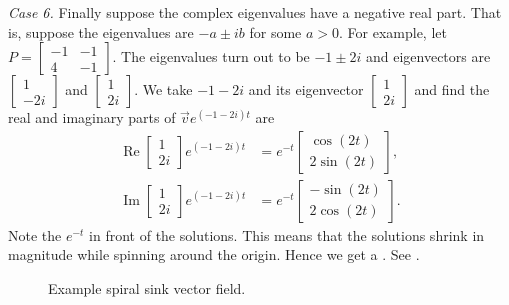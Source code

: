 \documentclass[12pt]{book}
\begin{document}
\medskip

\emph{Case 6.} Finally suppose the complex eigenvalues have a negative real
part.  That is, suppose the eigenvalues are $-a \pm ib$ for some $a > 0$.
For example, let $P = 
\left[ \begin{smallmatrix} -1 & -1 \\ 4 & -1 \end{smallmatrix} \right]$.
The eigenvalues turn out to be $-1\pm 2i$ and eigenvectors are
$\left[ \begin{smallmatrix} 1 \\ -2i \end{smallmatrix} \right]$ and
$\left[ \begin{smallmatrix} 1 \\ 2i \end{smallmatrix} \right]$.  We take
$-1 - 2i$ and its eigenvector
$\left[ \begin{smallmatrix} 1 \\ 2i \end{smallmatrix} \right]$ and find
the real and imaginary parts of
$\vec{v} e^{(-1-2i)t}$ are
\begin{align*}
\operatorname{Re}
\begin{bmatrix} 1 \\ 2i \end{bmatrix} e^{(-1-2i)t} & =
e^{-t}
\begin{bmatrix} \cos (2t) \\ 2 \sin (2t)  \end{bmatrix} ,
\\
\operatorname{Im}
\begin{bmatrix} 1 \\ 2i \end{bmatrix} e^{(-1-2i)t} & =
e^{-t}
\begin{bmatrix} -\sin (2t) \\ 2 \cos (2t) \end{bmatrix} .
\end{align*}
Note the $e^{-t}$ in front of the solutions.  This means that the solutions
shrink in magnitude while spinning around the origin.  Hence we get
a \emph{}.
See .

\begin{figure}[h!t]
\capstart
\begin{center}
\caption{Example spiral sink vector field.\label{pln:spiral-sinkfig}}
\end{center}
\end{figure}
\end{document}
